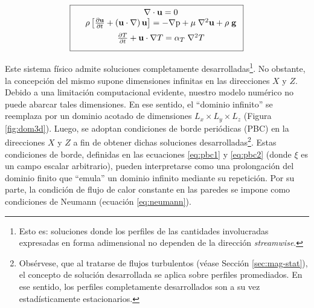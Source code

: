 \begin{equation}
        \boxed{ \begin{array}{lcc}
              &  \nabla \cdot  \mathbf{u}  = 0 \\
              \vspace*{2mm}
              &   \rho \left[ \frac{ \partial  \mathbf{u}}{\partial t} + \left( \mathbf{u} \cdot \nabla \right)   \mathbf{u} \right] = -\nabla \text{p} + \mu \hspace{1mm} {\nabla}^2 \mathbf{u}  + \rho \hspace{1mm} \mathbf{g} \\
              \vspace*{2mm}
              &  \frac{\partial T}{\partial t} + \mathbf{u} \cdot \nabla T =  \alpha_{T} \hspace{1mm} \nabla^2 T  \\
             \end{array}
               }
             \label{eq:gob_system}
\end{equation}

Este sistema físico admite soluciones completamente desarrolladas\footnote{Esto es: soluciones donde los perfiles de las cantidades involucradas expresadas en forma adimensional no dependen de la dirección \textit{streamwise}.}. No \linebreak obstante, la concepción del mismo supone dimensiones infinitas en las direcciones $X$ y $Z$. Debido a una limitación computacional evidente, nuestro modelo numérico no puede abarcar tales dimensiones. En ese sentido, el ``dominio infinito'' se reemplaza por un dominio acotado de dimensiones $L_x \times L_y \times L_z$ (Figura \ref{fig:dom3d}). Luego, se adoptan condiciones de borde periódicas (PBC) en la direcciones $X$ y $Z$ a fin de obtener dichas soluciones desarrolladas\footnote{Obsérvese, que al tratarse de flujos turbulentos (véase Sección \ref{sec:mag-stat}), el concepto de solución \linebreak desarrollada se aplica sobre perfiles promediados. En ese sentido, los perfiles completamente desarrollados son a su vez estadísticamente estacionarios.}. Estas condiciones de borde, definidas en las ecuaciones \ref{eq:pbc1} y \ref{eq:pbc2} (donde $\xi$ es un campo escalar arbitrario), pueden interpretarse como una prolongación del dominio finito que ``emula'' un dominio infinito mediante su repetición. Por su parte, la condición de flujo de calor constante en las paredes se impone como condiciones de Neumann (ecuación \ref{eq:neumann}).

